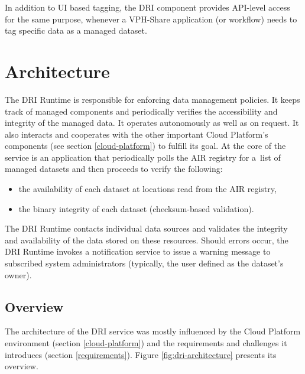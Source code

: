 In addition to UI based tagging, the DRI component provides API-level access
for the same purpose, whenever a VPH-Share application (or workflow) needs to
tag specific data as a managed dataset.

\section{Architecture}
The DRI Runtime is responsible for enforcing data management policies. It keeps
track of managed components and periodically verifies the accessibility and
integrity of the managed data. It operates autonomously as well as on request.
It also interacts and cooperates with the other important Cloud Platform's
components (see section \ref{cloud-platform}) to fulfill its goal. At the core
of the service is an application that periodically polls the AIR registry for
a~list of managed datasets and then proceeds to verify the following:

\begin{itemize}
	\item the availability of each dataset at locations read from the AIR
	registry,
	\item the binary integrity of each dataset (checksum-based validation).
\end{itemize}

The DRI Runtime contacts individual data sources and validates the integrity
and availability of the data stored on these resources. Should errors occur,
the DRI Runtime invokes a notification service to issue a warning message
to subscribed system administrators (typically, the user defined as the 
dataset's owner).\\

\subsection{Overview}
The architecture of the DRI service was mostly influenced by the Cloud Platform
environment (section \ref{cloud-platform}) and the requirements and challenges
it introduces (section \ref{requirements}). Figure \ref{fig:dri-architecture}
presents its overview.\\

